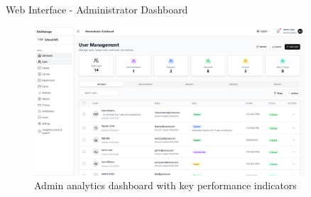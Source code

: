 \documentclass[aspectratio=169]{beamer}
\begin{document}
\begin{frame}{Web Interface - Administrator Dashboard}
    \begin{figure}
        \includegraphics[width=0.9\textwidth,height=0.6\textheight,keepaspectratio]{../pfe-pics/admin/Screenshot 2025-06-09 at 22-38-38 Vite React TS.png}
        \caption{Admin analytics dashboard with key performance indicators}
    \end{figure}
\end{frame}
\end{document}
